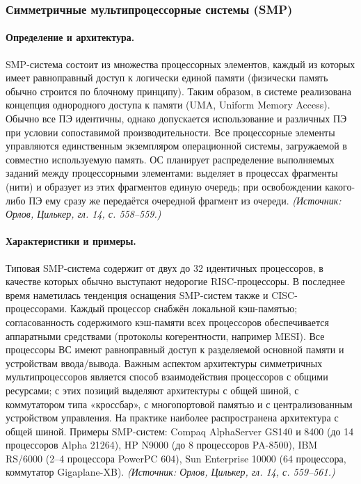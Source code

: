 \documentclass[a4paper,12pt]{article}
\begin{document}
\subsubsection{Симметричные мультипроцессорные системы (SMP)}

\paragraph{Определение и архитектура.}
SMP-система состоит из множества процессорных элементов, каждый из которых имеет равноправный доступ к логически единой памяти (физически память обычно строится по блочному принципу). Таким образом, в системе реализована концепция однородного доступа к памяти (UMA, Uniform Memory Access). Обычно все ПЭ идентичны, однако допускается использование и различных ПЭ при условии сопоставимой производительности. Все процессорные элементы управляются единственным экземпляром операционной системы, загружаемой в совместно используемую память. ОС планирует распределение выполняемых заданий между процессорными элементами: выделяет в процессах фрагменты (нити) и образует из этих фрагментов единую очередь; при освобождении какого-либо ПЭ ему сразу же передаётся очередной фрагмент из очереди.
\textit{(Источник: Орлов, Цилькер, гл. 14, с. 558--559.)}

\paragraph{Характеристики и примеры.}
Типовая SMP-система содержит от двух до 32 идентичных процессоров, в качестве которых обычно выступают недорогие RISC-процессоры. В последнее время наметилась тенденция оснащения SMP-систем также и CISC-процессорами. Каждый процессор снабжён локальной кэш-памятью; согласованность содержимого кэш-памяти всех процессоров обеспечивается аппаратными средствами (протоколы когерентности, например MESI). Все процессоры ВС имеют равноправный доступ к разделяемой основной памяти и устройствам ввода/вывода. Важным аспектом архитектуры симметричных мультипроцессоров является способ взаимодействия процессоров с общими ресурсами; с этих позиций выделяют архитектуры с общей шиной, с коммутатором типа «кроссбар», с многопортовой памятью и с централизованным устройством управления. На практике наиболее распространена архитектура с общей шиной. Примеры SMP-систем: Compaq AlphaServer GS140 и 8400 (до 14 процессоров Alpha 21264), HP N9000 (до 8 процессоров PA-8500), IBM RS/6000 (2–4 процессора PowerPC 604), Sun Enterprise 10000 (64 процессора, коммутатор Gigaplane-XB).
\textit{(Источник: Орлов, Цилькер, гл. 14, с. 559--561.)}
\end{document}
